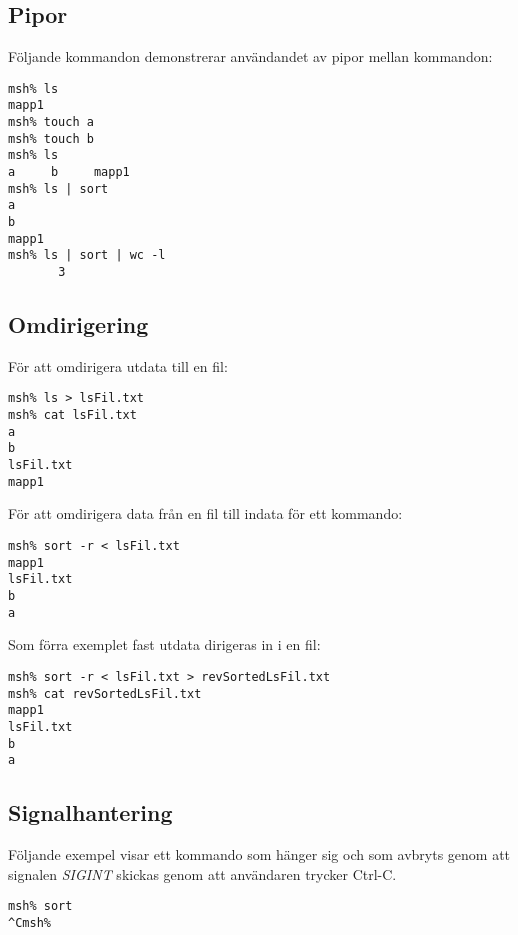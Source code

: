 \documentclass[a4paper, 12pt]{article}
\begin{document}
\subsection{Pipor}\label{sec:pipor}
Följande kommandon demonstrerar användandet av pipor mellan kommandon:
\begin{scriptsize}
\begin{verbatim}
msh% ls
mapp1
msh% touch a            
msh% touch b
msh% ls
a     b     mapp1
msh% ls | sort
a
b
mapp1
msh% ls | sort | wc -l
       3
\end{verbatim}
\end{scriptsize}

\subsection{Omdirigering}\label{sec:omdirigering}
För att omdirigera utdata till en fil:
\begin{scriptsize}
\begin{verbatim}
msh% ls > lsFil.txt
msh% cat lsFil.txt
a
b
lsFil.txt
mapp1
\end{verbatim}
\end{scriptsize}

För att omdirigera data från en fil till indata för ett kommando:
\begin{scriptsize}
\begin{verbatim}
msh% sort -r < lsFil.txt
mapp1
lsFil.txt
b
a
\end{verbatim}
\end{scriptsize}

Som förra exemplet fast utdata dirigeras in i en fil:
\begin{scriptsize}
\begin{verbatim}
msh% sort -r < lsFil.txt > revSortedLsFil.txt
msh% cat revSortedLsFil.txt
mapp1
lsFil.txt
b
a
\end{verbatim}
\end{scriptsize}

\subsection{Signalhantering}\label{sec:signalhantering}
Följande exempel visar ett kommando som hänger sig och som avbryts
genom att signalen \textit{SIGINT} skickas genom att användaren
trycker Ctrl-C.
\begin{scriptsize}
\begin{verbatim}
msh% sort
^Cmsh% 
\end{verbatim}
\end{scriptsize}
\end{document}
